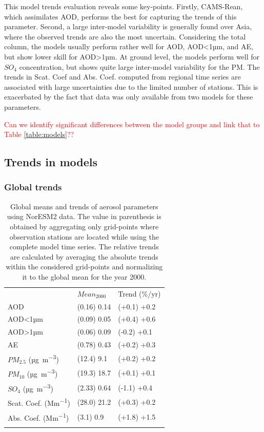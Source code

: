 \documentclass[journal abbreviation, manuscript]{copernicus}
\begin{document}
This model trends evaluation reveals some key-points. Firstly, CAMS-Rean, which assimilates AOD, performs the best for capturing the trends of this parameter. Second, a large inter-model variability is generally found over Asia, where the observed trends are also the most uncertain.
Considering the total column, the models usually perform rather well for AOD, AOD<1µm, and AE, but show lower skill for AOD>1µm. At ground level, the models perform well for $SO_{4}$ concentration, but shows quite large inter-model variability for the PM. The trends in Scat. Coef and Abs. Coef. computed from regional time series are associated with large uncertainties due to the limited number of stations. This is exacerbated by the fact that data was only available from two models for these parameters.

\textcolor{red}{Can we identify significant differences between the model groups and link that to Table \ref{table:models}??}

\subsection{Trends in models}\label{global_trends}

\subsubsection{Global trends}

\begin{table}
 \begin{tabular}{lll}
  \tophline
                                & $Mean_{2000}$ & Trend (\%/yr) \\
  \middlehline
  AOD                           & (0.16) 0.14   & (+0.1) +0.2   \\
  AOD<1µm                       & (0.09) 0.05   & (+0.4) +0.6   \\
  AOD>1µm                       & (0.06) 0.09   & (-0.2) +0.1   \\
  AE                            & (0.78) 0.43   & (+0.2) +0.3   \\
  $PM_{2.5}$ (\unit{µg.m^{-3}}) & (12.4) 9.1    & (+0.2) +0.2   \\
  $PM_{10}$ (\unit{µg.m^{-3}})  & (19.3) 18.7   & (+0.1) +0.1   \\
  $SO_{4}$ (\unit{µg.m^{-3}})   & (2.33) 0.64   & (-1.1) +0.4   \\
  Scat. Coef. (\unit{Mm^{-1}})  & (28.0) 21.2   & (+0.3) +0.2   \\
  Abs. Coef. (\unit{Mm^{-1}})   & (3.1) 0.9     & (+1.8) +1.5   \\
  \bottomhline
 \end{tabular}
 \caption{Global means and trends of aerosol parameters using NorESM2 data. The value in parenthesis is obtained by aggregating only grid-points where observation stations are located while using the complete model time series. The relative trends are calculated by averaging the absolute trends within the considered grid-points and normalizing it to the global mean for the year 2000.}
 \label{table:global_trends}
\end{table}
\end{document}
